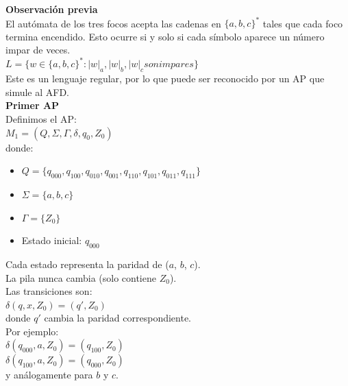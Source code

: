 \documentclass[12pt]{article}
\newcommand{\Aspace}{0.2cm}
\begin{document}
\renewcommand{\thefigure}{\arabic{figure}}
    \vspace{\Aspace} \par
    { \color{azul}
        \textbf{Observación previa} \\
        El autómata de los tres focos acepta las cadenas en $\{ a, b, c \}^{*}$ tales que cada foco termina encendido. 
        Esto ocurre si y solo si cada símbolo aparece un número impar de veces. \\
        $L = \{ w \in \{ a, b, c \}^{*}: |w|_{a}, |w|_{b}, |w|_{c} son impares \}$ \\
        Este es un lenguaje regular, por lo que puede ser reconocido por un AP que simule al AFD. \\

        \newpage
        \textbf{Primer AP} \\
        Definimos el AP: \\
        $M_{1} = (Q, \Sigma, \Gamma, \delta, q_{0}, Z_{0})$ \\
        donde: 
        \begin{itemize}
            \item $Q = \{ q_{000}, q_{100}, q_{010}, q_{001}, q_{110}, q_{101}, q_{011}, q_{111} \}$

            \item $\Sigma = \{ a, b, c \}$

            \item $\Gamma = \{ Z_0 \}$

            \item Estado inicial: $q_{000}$
        \end{itemize}
        Cada estado representa la paridad de ($a$, $b$, $c$). \\
        La pila nunca cambia (solo contiene $Z_{0}$). \\
        Las transiciones son: \\
        $\delta(q, x, Z_{0}) = (q', Z_{0})$ \\
        donde $q'$ cambia la paridad correspondiente. \\

        Por ejemplo: \\
        $\delta(q_{000}, a, Z_{0}) = (q_{100}, Z_{0})$ \\
        $\delta(q_{100}, a, Z_{0}) = (q_{000}, Z_{0})$ \\
        y análogamente para $b$ y $c$. \\

}
\end{document}
